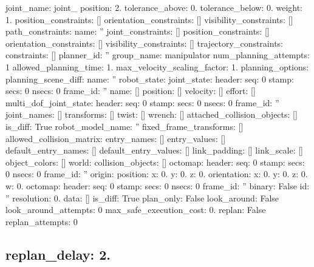 \begin{DoxyItemize}
\begin{DoxyItemize}
\item joint\-\_\-name\-: joint\-\_ position\-: 2. tolerance\-\_\-above\-: 0. tolerance\-\_\-below\-: 0. weight\-: 1. position\-\_\-constraints\-: \mbox{[}\mbox{]} orientation\-\_\-constraints\-: \mbox{[}\mbox{]} visibility\-\_\-constraints\-: \mbox{[}\mbox{]} path\-\_\-constraints\-: name\-: '' joint\-\_\-constraints\-: \mbox{[}\mbox{]} position\-\_\-constraints\-: \mbox{[}\mbox{]} orientation\-\_\-constraints\-: \mbox{[}\mbox{]} visibility\-\_\-constraints\-: \mbox{[}\mbox{]} trajectory\-\_\-constraints\-: constraints\-: \mbox{[}\mbox{]} planner\-\_\-id\-: '' group\-\_\-name\-: manipulator num\-\_\-planning\-\_\-attempts\-: 1 allowed\-\_\-planning\-\_\-time\-: 1. max\-\_\-velocity\-\_\-scaling\-\_\-factor\-: 1. planning\-\_\-options\-: planning\-\_\-scene\-\_\-diff\-: name\-: '' robot\-\_\-state\-: joint\-\_\-state\-: header\-: seq\-: 0 stamp\-: secs\-: 0 nsecs\-: 0 frame\-\_\-id\-: '' name\-: \mbox{[}\mbox{]} position\-: \mbox{[}\mbox{]} velocity\-: \mbox{[}\mbox{]} effort\-: \mbox{[}\mbox{]} multi\-\_\-dof\-\_\-joint\-\_\-state\-: header\-: seq\-: 0 stamp\-: secs\-: 0 nsecs\-: 0 frame\-\_\-id\-: '' joint\-\_\-names\-: \mbox{[}\mbox{]} transforms\-: \mbox{[}\mbox{]} twist\-: \mbox{[}\mbox{]} wrench\-: \mbox{[}\mbox{]} attached\-\_\-collision\-\_\-objects\-: \mbox{[}\mbox{]} is\-\_\-diff\-: True robot\-\_\-model\-\_\-name\-: '' fixed\-\_\-frame\-\_\-transforms\-: \mbox{[}\mbox{]} allowed\-\_\-collision\-\_\-matrix\-: entry\-\_\-names\-: \mbox{[}\mbox{]} entry\-\_\-values\-: \mbox{[}\mbox{]} default\-\_\-entry\-\_\-names\-: \mbox{[}\mbox{]} default\-\_\-entry\-\_\-values\-: \mbox{[}\mbox{]} link\-\_\-padding\-: \mbox{[}\mbox{]} link\-\_\-scale\-: \mbox{[}\mbox{]} object\-\_\-colors\-: \mbox{[}\mbox{]} world\-: collision\-\_\-objects\-: \mbox{[}\mbox{]} octomap\-: header\-: seq\-: 0 stamp\-: secs\-: 0 nsecs\-: 0 frame\-\_\-id\-: '' origin\-: position\-: x\-: 0. y\-: 0. z\-: 0. orientation\-: x\-: 0. y\-: 0. z\-: 0. w\-: 0. octomap\-: header\-: seq\-: 0 stamp\-: secs\-: 0 nsecs\-: 0 frame\-\_\-id\-: '' binary\-: False id\-: '' resolution\-: 0. data\-: \mbox{[}\mbox{]} is\-\_\-diff\-: True plan\-\_\-only\-: False look\-\_\-around\-: False look\-\_\-around\-\_\-attempts\-: 0 max\-\_\-safe\-\_\-execution\-\_\-cost\-: 0. replan\-: False replan\-\_\-attempts\-: 0 \subsection*{replan\-\_\-delay\-: 2. }
\end{DoxyItemize}
\end{DoxyItemize}

